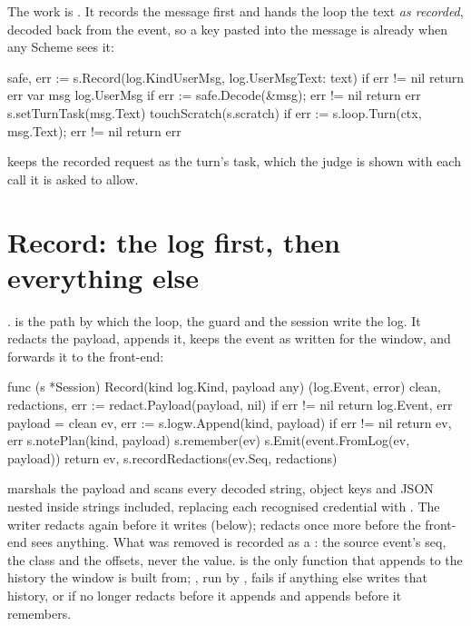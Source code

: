 The work is . It records the message first and hands the loop
the text \emph{as recorded}, decoded back from the event, so a key pasted
into the message is already  when any Scheme sees
it:

\begin{go}
safe, err := s.Record(log.KindUserMsg, log.UserMsg{Text: text})
if err != nil {
    return err
}
var msg log.UserMsg
if err := safe.Decode(&msg); err != nil {
    return err
}
s.setTurnTask(msg.Text)
touchScratch(s.scratch)
if err := s.loop.Turn(ctx, msg.Text); err != nil {
    return err
}
\end{go}

 keeps the recorded request as the turn's task, which
the judge is shown with each call it is asked to allow.

\section{Record: the log first, then everything else}

.  is the path by which the loop,
the guard and the session write the log. It redacts the payload, appends it,
keeps the event as written for the window, and forwards it to the
front-end:

\begin{go}
func (s *Session) Record(kind log.Kind, payload any) (log.Event, error) {
    clean, redactions, err := redact.Payload(payload, nil)
    if err != nil {
        return log.Event{}, err
    }
    payload = clean
    ev, err := s.logw.Append(kind, payload)
    if err != nil {
        return ev, err
    }
    s.notePlan(kind, payload)
    s.remember(ev)
    s.Emit(event.FromLog(ev, payload))
    return ev, s.recordRedactions(ev.Seq, redactions)
}
\end{go}

 marshals the payload and scans every decoded string,
object keys and JSON nested inside strings included, replacing each
recognised credential with . The writer redacts
again before it writes (below);  redacts once more before the
front-end sees anything. What was removed is recorded as a
: the source event's seq, the class and the offsets,
never the value.  is the only function that appends to the
history the window is built from; , run by
, fails if anything else writes that history, or if
 no longer redacts before it appends and appends before it
remembers.

